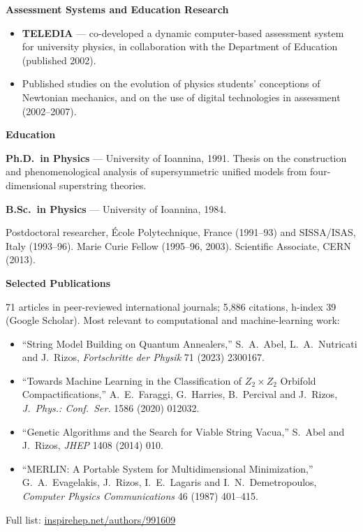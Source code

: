 \documentclass[a4paper,10.5pt]{article}
\newcommand{\sect}[1]{%
  \vspace{9pt}%
  {\large\bfseries #1}\par
  \vspace{2pt}{\color{rule}\hrule height 0.6pt}\vspace{6pt}%
}
\begin{document}
\sect{Assessment Systems and Education Research}

\begin{itemize}
\item \textbf{TELEDIA} --- co-developed a dynamic computer-based
  assessment system for university physics, in collaboration with the
  Department of Education (published 2002).
\item Published studies on the evolution of physics students' conceptions
  of Newtonian mechanics, and on the use of digital technologies in
  assessment (2002--2007).
\end{itemize}

\sect{Education}

\textbf{Ph.D.\ in Physics} --- University of Ioannina, 1991.
Thesis on the construction and phenomenological analysis of
supersymmetric unified models from four-dimensional superstring theories.\par
\vspace{2pt}
\textbf{B.Sc.\ in Physics} --- University of Ioannina, 1984.\par
\vspace{2pt}
Postdoctoral researcher, École Polytechnique, France (1991--93) and
SISSA/ISAS, Italy (1993--96). Marie Curie Fellow (1995--96, 2003).
Scientific Associate, CERN (2013).

\sect{Selected Publications}

71 articles in peer-reviewed international journals; 5{,}886 citations,
h-index 39 (Google Scholar). Most relevant to computational and
machine-learning work:
\begin{itemize}
\item ``String Model Building on Quantum Annealers,'' S.~A.~Abel,
  L.~A.~Nutricati and J.~Rizos, \textit{Fortschritte der Physik} 71
  (2023) 2300167.
\item ``Towards Machine Learning in the Classification of $Z_2\times Z_2$
  Orbifold Compactifications,'' A.~E.~Faraggi, G.~Harries, B.~Percival
  and J.~Rizos, \textit{J.~Phys.: Conf.~Ser.} 1586 (2020) 012032.
\item ``Genetic Algorithms and the Search for Viable String Vacua,''
  S.~Abel and J.~Rizos, \textit{JHEP} 1408 (2014) 010.
\item ``MERLIN: A Portable System for Multidimensional Minimization,''
  G.~A.~Evagelakis, J.~Rizos, I.~E.~Lagaris and I.~N.~Demetropoulos,
  \textit{Computer Physics Communications} 46 (1987) 401--415.
\end{itemize}

Full list: \href{https://inspirehep.net/authors/991609}{inspirehep.net/authors/991609}
\end{document}
